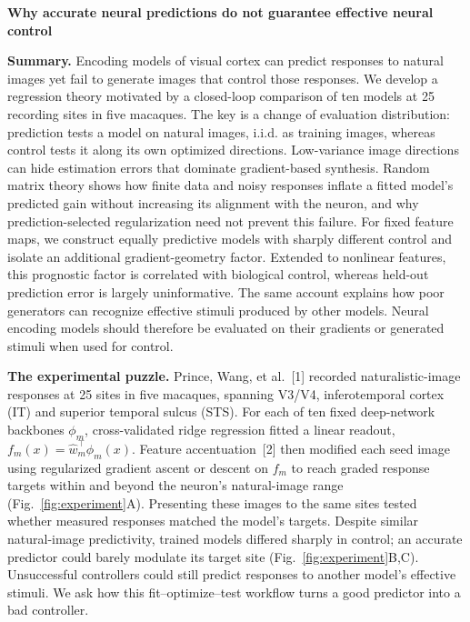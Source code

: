 \documentclass[12pt,a4paper]{article}
\newcommand{\head}[1]{\par\noindent\textbf{#1}\enspace\ignorespaces}
\begin{document}
{\large\bfseries Why accurate neural predictions do not guarantee effective neural control\par}

\textbf{Summary.}
Encoding models of visual cortex can predict responses to natural images yet fail to generate images that control those responses. We develop a regression theory motivated by a closed-loop comparison of ten models at 25 recording sites in five macaques. The key is a change of evaluation distribution: prediction tests a model on natural images, i.i.d. as training images, whereas control tests it along its own optimized directions. Low-variance image directions can hide estimation errors that dominate gradient-based synthesis. Random matrix theory shows how finite data and noisy responses inflate a fitted model's predicted gain without increasing its alignment with the neuron, and why prediction-selected regularization need not prevent this failure. For fixed feature maps, we construct equally predictive models with sharply different control and isolate an additional gradient-geometry factor. Extended to nonlinear features, this prognostic factor is correlated with biological control, whereas held-out prediction error is largely uninformative. The same account explains how poor generators can recognize effective stimuli produced by other models. Neural encoding models should therefore be evaluated on their gradients or generated stimuli when used for control.

\head{The experimental puzzle.}
Prince, Wang, et al.~[1] recorded naturalistic-image responses at 25 sites in five macaques, spanning V3/V4, inferotemporal cortex (IT) and superior temporal sulcus (STS). For each of ten fixed deep-network backbones $\phi_m$, cross-validated ridge regression fitted a linear readout, $f_m(x)=\hat w_m^\top\phi_m(x)$. Feature accentuation~[2] then modified each seed image using regularized gradient ascent or descent on $f_m$ to reach graded response targets within and beyond the neuron's natural-image range (Fig.~\ref{fig:experiment}A). Presenting these images to the same sites tested whether measured responses matched the model's targets. Despite similar natural-image predictivity, trained models differed sharply in control; an accurate predictor could barely modulate its target site (Fig.~\ref{fig:experiment}B,C). Unsuccessful controllers could still predict responses to another model's effective stimuli. We ask how this fit--optimize--test workflow turns a good predictor into a bad controller.
\end{document}
